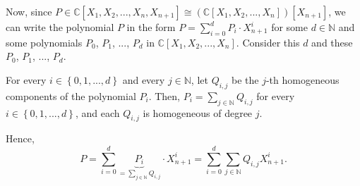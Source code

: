 \documentclass
[numbers=enddot,12pt,final,onecolumn,german,notitlepage]{scrartcl}%
\theoremstyle{definition}
\begin{document}
Now, since $P\in\mathbb{C}\left[  X_{1},X_{2},...,X_{n},X_{n+1}\right]
\cong\left(  \mathbb{C}\left[  X_{1},X_{2},...,X_{n}\right]  \right)  \left[
X_{n+1}\right]  $, we can write the polynomial $P$ in the form $P=\sum
\limits_{i=0}^{d}P_{i}\cdot X_{n+1}^{i}$ for some $d\in\mathbb{N}$ and some
polynomials $P_{0}$, $P_{1}$, $...$, $P_{d}$ in $\mathbb{C}\left[  X_{1}%
,X_{2},...,X_{n}\right]  $. Consider this $d$ and these $P_{0}$, $P_{1}$,
$...$, $P_{d}$.

For every $i\in\left\{  0,1,...,d\right\}  $ and every $j\in\mathbb{N}$, let
$Q_{i,j}$ be the $j$-th homogeneous components of the polynomial $P_{i}$.
Then, $P_{i}=\sum\limits_{j\in\mathbb{N}}Q_{i,j}$ for every $i\in\left\{
0,1,...,d\right\}  $, and each $Q_{i,j}$ is homogeneous of degree $j$.

Hence,%
\begin{equation}
P=\sum\limits_{i=0}^{d}\underbrace{P_{i}}_{=\sum\limits_{j\in\mathbb{N}%
}Q_{i,j}}\cdot X_{n+1}^{i}=\sum\limits_{i=0}^{d}\sum\limits_{j\in\mathbb{N}%
}Q_{i,j}X_{n+1}^{i}. \label{pf.invformnondeg.elemen.3a}%
\end{equation}
\end{document}
